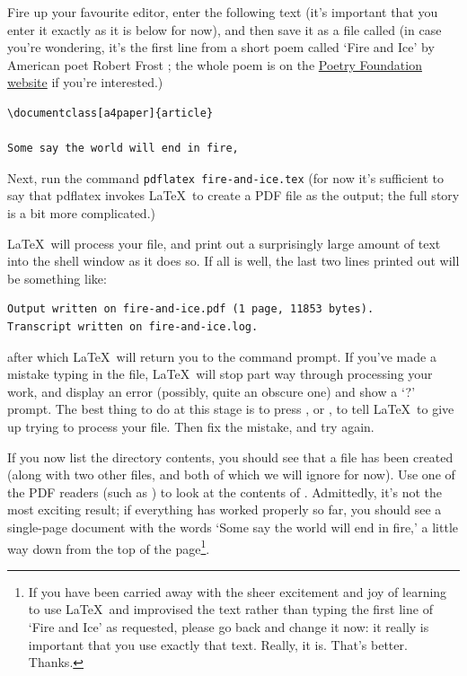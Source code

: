 \begin{refsection}
\begin{quote}
\end{quote}


\label{sec:exercise-1}


Fire up your favourite editor, enter the following text (it's important that you enter it exactly as it is below for now), and then save it as a file called  (in case you're wondering, it's the first line from a short poem called `Fire and Ice' by American poet Robert Frost \citep{frost1923}; the whole poem is on the \href{http://www.poetryfoundation.org/poem/173527}{Poetry Foundation website} if you're interested.)

\begin{verbatim}
\documentclass[a4paper]{article}

Some say the world will end in fire,

\end{verbatim}
%
Next, run the command \texttt{pdflatex fire-and-ice.tex} (for now it's sufficient to say that pdflatex invokes \LaTeX\ to create a PDF file as the output; the full story is a bit more complicated.)

\LaTeX\ will process your file, and print out a surprisingly large amount of text into the shell window as it does so. If all is well, the last two lines printed out will be something like:

\begin{verbatim}
Output written on fire-and-ice.pdf (1 page, 11853 bytes).
Transcript written on fire-and-ice.log.
\end{verbatim}
%
after which \LaTeX\ will return you to the command prompt. If you've made a mistake typing in the file, \LaTeX\ will stop part way through processing your work, and display an error (possibly, quite an obscure one) and show a `?' prompt. The best thing to do at this stage is to press , or , to tell \LaTeX\ to give up trying to process your file. Then fix the mistake, and try again.  

If you now list the directory contents, you should see that a file   has been created (along with two other files,  and  both of which we will ignore for now). Use one of the PDF readers (such as ) to look at the contents of .  Admittedly, it's not the most exciting result; if everything has worked properly so far, you should see a single-page document with the words `Some say the world will end in fire,' a little way down from the top of the page\footnote{If you have been carried away with the sheer excitement and joy of learning to use \LaTeX\, and improvised the text rather than typing the first line of `Fire and Ice' as requested, please go back and change it now: it really is important that you use exactly that text. Really, it is. That's better. Thanks.}.


\end{refsection}
